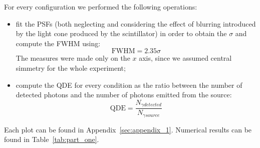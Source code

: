 \documentclass[a4paper]{article}
\begin{document}
For every configuration we performed the following operations:
\begin{itemize}
  \item fit the PSFs (both neglecting and considering the effect of blurring introduced by the light cone produced by the scintillator) in order to obtain the $\sigma$ and compute the FWHM using:
    \begin{equation}
      \text{FWHM}=2.35\sigma
      \label{eq:fwhm}
    \end{equation}
    The measures were made only on the $x$ axis, since we assumed central simmetry for the whole experiment;
  \item compute the QDE for every condition as the ratio between the number of detected photons and the number of photons emitted from the source:
    \begin{equation}
      \text{QDE}=\frac{N_{\gamma detected}}{N_{\gamma source}}
      \label{eq:qde}
    \end{equation}
\end{itemize}
Each plot can be found in Appendix~\ref{sec:appendix_1}. Numerical results can be found in Table~\ref{tab:part_one}.
\end{document}

